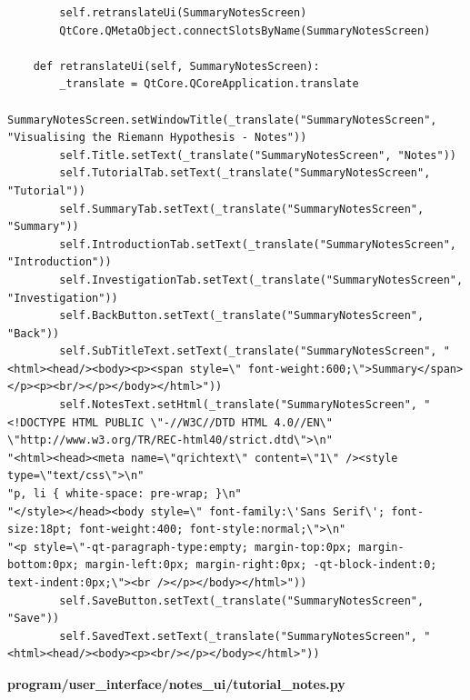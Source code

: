 \documentclass{article}
\begin{document}
\begin{lstlisting}
        self.retranslateUi(SummaryNotesScreen)
        QtCore.QMetaObject.connectSlotsByName(SummaryNotesScreen)

    def retranslateUi(self, SummaryNotesScreen):
        _translate = QtCore.QCoreApplication.translate
        SummaryNotesScreen.setWindowTitle(_translate("SummaryNotesScreen", "Visualising the Riemann Hypothesis - Notes"))
        self.Title.setText(_translate("SummaryNotesScreen", "Notes"))
        self.TutorialTab.setText(_translate("SummaryNotesScreen", "Tutorial"))
        self.SummaryTab.setText(_translate("SummaryNotesScreen", "Summary"))
        self.IntroductionTab.setText(_translate("SummaryNotesScreen", "Introduction"))
        self.InvestigationTab.setText(_translate("SummaryNotesScreen", "Investigation"))
        self.BackButton.setText(_translate("SummaryNotesScreen", "Back"))
        self.SubTitleText.setText(_translate("SummaryNotesScreen", "<html><head/><body><p><span style=\" font-weight:600;\">Summary</span></p><p><br/></p></body></html>"))
        self.NotesText.setHtml(_translate("SummaryNotesScreen", "<!DOCTYPE HTML PUBLIC \"-//W3C//DTD HTML 4.0//EN\" \"http://www.w3.org/TR/REC-html40/strict.dtd\">\n"
"<html><head><meta name=\"qrichtext\" content=\"1\" /><style type=\"text/css\">\n"
"p, li { white-space: pre-wrap; }\n"
"</style></head><body style=\" font-family:\'Sans Serif\'; font-size:18pt; font-weight:400; font-style:normal;\">\n"
"<p style=\"-qt-paragraph-type:empty; margin-top:0px; margin-bottom:0px; margin-left:0px; margin-right:0px; -qt-block-indent:0; text-indent:0px;\"><br /></p></body></html>"))
        self.SaveButton.setText(_translate("SummaryNotesScreen", "Save"))
        self.SavedText.setText(_translate("SummaryNotesScreen", "<html><head/><body><p><br/></p></body></html>"))
\end{lstlisting}


\textbf{program/user\_interface/notes\_ui/tutorial\_notes.py}
\end{document}
